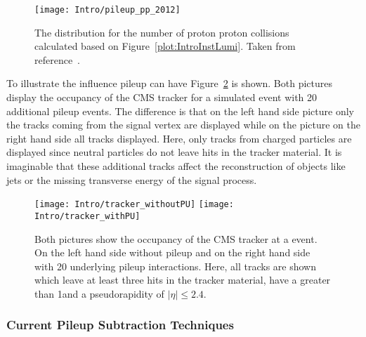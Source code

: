 \begin{figure}[!Hhtb]
    \centering
    \texttt{[image: Intro/pileup\_pp\_2012]}
    \caption[Number of pp collisions]{The distribution for the number of proton proton collisions calculated based on Figure~\ref{plot:IntroInstLumi}. Taken from reference~. \label{plot:IntroPileupDistr}}
\end{figure}

To illustrate the influence pileup can have Figure~\ref{plot:IntroOccuTracker} is shown. Both pictures display the occupancy of the CMS tracker for a simulated \ttbar event with 20 additional pileup events. The difference is that on the left hand side picture only the tracks coming from the signal vertex are displayed while on the picture on the right hand side all tracks displayed. Here, only tracks from charged particles are displayed since neutral particles do not leave hits in the tracker material. It is imaginable that these additional tracks affect the reconstruction of objects like jets or the missing transverse energy of the signal process.

\begin{figure}[!Hhtb]
    \centering
    \texttt{[image: Intro/tracker\_withoutPU]}
    \texttt{[image: Intro/tracker\_withPU]}
    \caption[Occupancy of the tracker with and without pileup]{Both pictures show the occupancy of the CMS tracker at a \ttbar event. On the left hand side without pileup and on the right hand side with 20 underlying pileup interactions. Here, all tracks are shown which leave at least three hits in the tracker material, have a \pt greater than 1\GeVc and a pseudorapidity of $\left|\eta\right|\leq2.4$. \label{plot:IntroOccuTracker}}
\end{figure}

\subsubsection{Current Pileup Subtraction Techniques \label{sec:IntroCurPST}}

